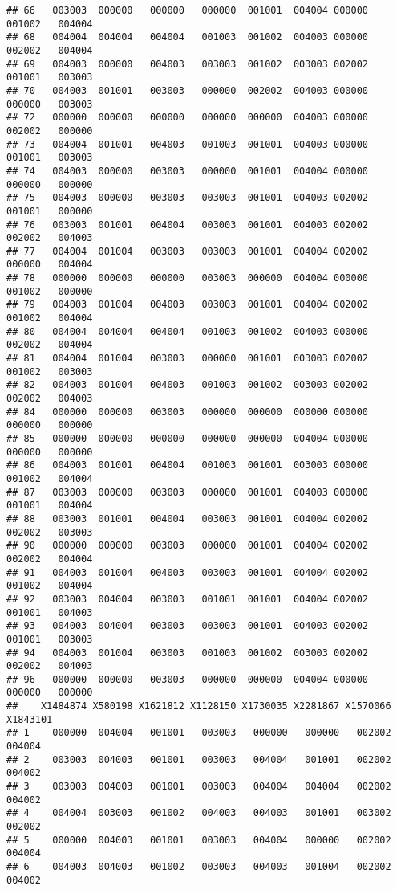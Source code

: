 \documentclass[
]{article}
\begin{document}
\begin{verbatim}
## 66   003003  000000   000000   000000  001001  004004 000000  001002   004004
## 68   004004  004004   004004   001003  001002  004003 000000  002002   004004
## 69   004003  000000   004003   003003  001002  003003 002002  001001   003003
## 70   004003  001001   003003   000000  002002  004003 000000  000000   003003
## 72   000000  000000   000000   000000  000000  004003 000000  002002   000000
## 73   004004  001001   004003   001003  001001  004003 000000  001001   003003
## 74   004003  000000   003003   000000  001001  004004 000000  000000   000000
## 75   004003  000000   003003   003003  001001  004003 002002  001001   000000
## 76   003003  001001   004004   003003  001001  004003 002002  002002   004003
## 77   004004  001004   003003   003003  001001  004004 002002  000000   004004
## 78   000000  000000   000000   003003  000000  004004 000000  001002   000000
## 79   004003  001004   004003   003003  001001  004004 002002  001002   004004
## 80   004004  004004   004004   001003  001002  004003 000000  002002   004004
## 81   004004  001004   003003   000000  001001  003003 002002  001002   003003
## 82   004003  001004   004003   001003  001002  003003 002002  002002   004003
## 84   000000  000000   003003   000000  000000  000000 000000  000000   000000
## 85   000000  000000   000000   000000  000000  004004 000000  000000   000000
## 86   004003  001001   004004   001003  001001  003003 000000  001002   004004
## 87   003003  000000   003003   000000  001001  004003 000000  001001   004004
## 88   003003  001001   004004   003003  001001  004004 002002  002002   003003
## 90   000000  000000   003003   000000  001001  004004 002002  002002   004004
## 91   004003  001004   004003   003003  001001  004004 002002  001002   004004
## 92   003003  004004   003003   001001  001001  004004 002002  001001   004003
## 93   004003  004004   003003   003003  001001  004003 002002  001001   003003
## 94   004003  001004   003003   001003  001002  003003 002002  002002   004003
## 96   000000  000000   003003   000000  000000  004004 000000  000000   000000
##    X1484874 X580198 X1621812 X1128150 X1730035 X2281867 X1570066 X1843101
## 1    000000  004004   001001   003003   000000   000000   002002   004004
## 2    003003  004003   001001   003003   004004   001001   002002   004002
## 3    003003  004003   001001   003003   004004   004004   002002   004002
## 4    004004  003003   001002   004003   004003   001001   003002   002002
## 5    000000  004003   001001   003003   004004   000000   002002   004004
## 6    004003  004003   001002   003003   004003   001004   002002   004002

\end{verbatim}
\end{document}
